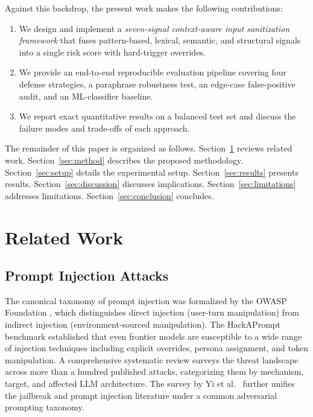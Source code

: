 \documentclass[10pt,conference]{IEEEtran}
\begin{document}
Against this backdrop, the present work makes the following
contributions:
\begin{enumerate}
  \item We design and implement a \emph{seven-signal context-aware
        input sanitization framework} that fuses pattern-based,
        lexical, semantic, and structural signals into a single
        risk score with hard-trigger overrides.
  \item We provide an end-to-end reproducible evaluation pipeline
        covering four defense strategies, a paraphrase robustness
        test, an edge-case false-positive audit, and an ML-classifier
        baseline.
  \item We report exact quantitative results on a balanced test set
        and discuss the failure modes and trade-offs of each approach.
\end{enumerate}

The remainder of this paper is organized as follows.
Section~\ref{sec:related} reviews related work.
Section~\ref{sec:method} describes the proposed methodology.
Section~\ref{sec:setup} details the experimental setup.
Section~\ref{sec:results} presents results.
Section~\ref{sec:discussion} discusses implications.
Section~\ref{sec:limitations} addresses limitations.
Section~\ref{sec:conclusion} concludes.

\section{Related Work}
\label{sec:related}

\subsection{Prompt Injection Attacks}

The canonical taxonomy of prompt injection was formalized by the OWASP
Foundation \cite{owasp_llm}, which distinguishes direct injection
(user-turn manipulation) from indirect injection
\cite{greshake2023indirect} (environment-sourced manipulation).
The HackAPrompt benchmark \cite{perez2022ignore} established that even
frontier models are susceptible to a wide range of injection
techniques including explicit overrides, persona assignment, and
token manipulation.
A comprehensive systematic review \cite{11359704} surveys the
threat landscape across more than a hundred published attacks,
categorizing them by mechanism, target, and affected LLM architecture.
The survey by Yi et al.\ \cite{yi2024jailbreak} further unifies the
jailbreak and prompt injection literature under a common adversarial
prompting taxonomy.
\end{document}
